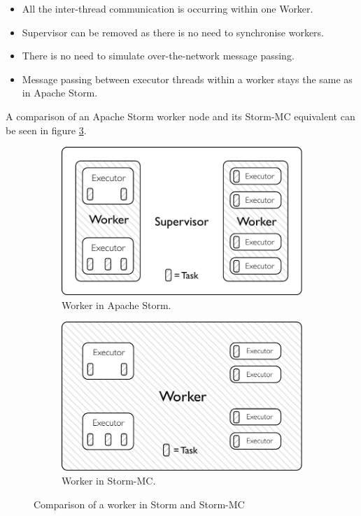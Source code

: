 \begin{itemize}
	\item All the inter-thread communication is occurring within one Worker.
	\item Supervisor can be removed as there is no need to synchronise workers.
	\item There is no need to simulate over-the-network message passing.
	\item Message passing between executor threads within a worker stays the same as in Apache Storm.
\end{itemize}

A comparison of an Apache Storm worker node and its Storm-MC equivalent can be seen in figure \ref{fig:comparison}.

\begin{figure}[!htb]
\centering
\begin{subfigure}{.5\textwidth}
  \centering
  \includegraphics[width=0.95\linewidth]{pdf/distributed_worker.pdf}
  \caption{Worker in Apache Storm.}
  \label{fig:comparison1}
\end{subfigure}%
\begin{subfigure}{.5\textwidth}
  \centering
  \includegraphics[width=0.95\linewidth]{pdf/local_worker.pdf}
  \caption{Worker in Storm-MC.}
  \label{fig:comparison2}
\end{subfigure}
\caption{Comparison of a worker in Storm and Storm-MC}
\label{fig:comparison}
\end{figure}


